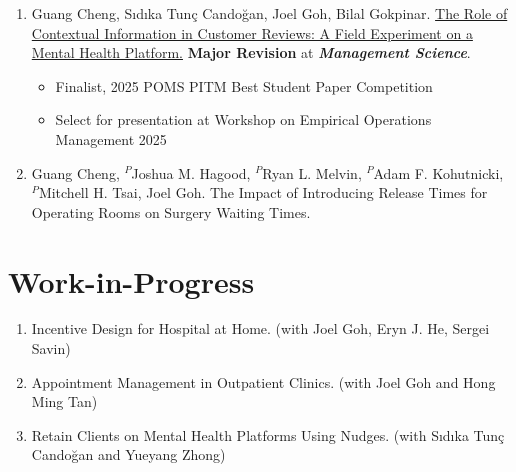 \documentclass[12pt, a4paper]{article}
\begin{document}
{\begin{enumerate}[leftmargin=30pt, resume]
	
	\item Guang Cheng, S\i{}d\i{}ka Tun\c{c} Cando\u{g}an, Joel Goh, Bilal Gokpinar.
	\href{https://ssrn.com/abstract=4956298}{The Role of Contextual Information in Customer Reviews: A Field Experiment on a Mental Health Platform.} {\bf Major Revision} at \textit{\textbf{Management Science}}.

	\begin{itemize}
		\item {\footnotesize Finalist, 2025 POMS PITM Best Student Paper Competition}
		\item {\footnotesize Select for presentation at Workshop on Empirical Operations Management 2025}
	\end{itemize}

	\item Guang Cheng, $^P$Joshua M. Hagood, $^P$Ryan L. Melvin, $^P$Adam F. Kohutnicki, $^P$Mitchell H. Tsai, Joel Goh. The Impact of Introducing Release Times for Operating Rooms on Surgery Waiting Times.

\end{enumerate}




\section*{Work-in-Progress}

\begin{enumerate}[leftmargin=30pt, resume]

	\item Incentive Design for Hospital at Home. (with Joel Goh, Eryn J. He, Sergei Savin)
	
	\item Appointment Management in Outpatient Clinics. (with Joel Goh and Hong Ming Tan)
	
	\item Retain Clients on Mental Health Platforms Using Nudges. (with S\i{}d\i{}ka Tun\c{c} Cando\u{g}an and Yueyang Zhong) 
	
\end{enumerate}



}
\end{document}
